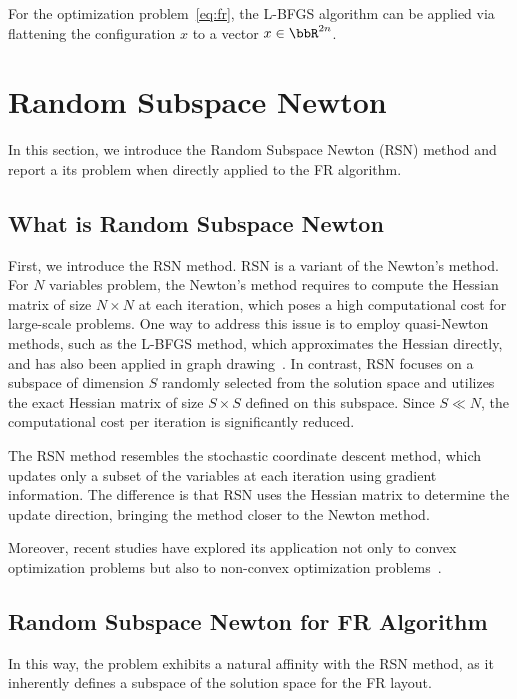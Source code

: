\documentclass[dvipdfmx,journal]{IEEEtran}
\begin{document}
For the optimization problem~\eqref{eq:fr}, the L-BFGS algorithm can be applied via flattening the configuration $x$ to a vector $x \in \bbR^{2n}$.

\section{Random Subspace Newton}\label{sec:RSN}

In this section, we introduce the Random Subspace Newton (RSN) method and report a its problem when directly applied to the FR algorithm.

\subsection{What is Random Subspace Newton}

First, we introduce the RSN method.
RSN is a variant of the Newton's method.
For $N$ variables problem, the Newton's method requires to compute the Hessian matrix of size $N \times N$ at each iteration, which poses a high computational cost for large-scale problems.
One way to address this issue is to employ quasi-Newton methods, such as the L-BFGS method, which approximates the Hessian directly, and has also been applied in graph drawing~\cite{6183577}.
In contrast, RSN focuses on a subspace of dimension $S$ randomly selected from the solution space and utilizes the exact Hessian matrix of size $S \times S$ defined on this subspace.
Since $S \ll N$, the computational cost per iteration is significantly reduced.

The RSN method resembles the stochastic coordinate descent method, which updates only a subset of the variables at each iteration using gradient information. The difference is that RSN uses the Hessian matrix to determine the update direction, bringing the method closer to the Newton method.

Moreover, recent studies have explored its application not only to convex optimization problems but also to non-convex optimization problems~\cite{fujiRandomizedSubspaceRegularized2022}.

\subsection{Random Subspace Newton for FR Algorithm}

In this way, the problem exhibits a natural affinity with the RSN method, as it inherently defines a subspace of the solution space for the FR layout.
\end{document}
